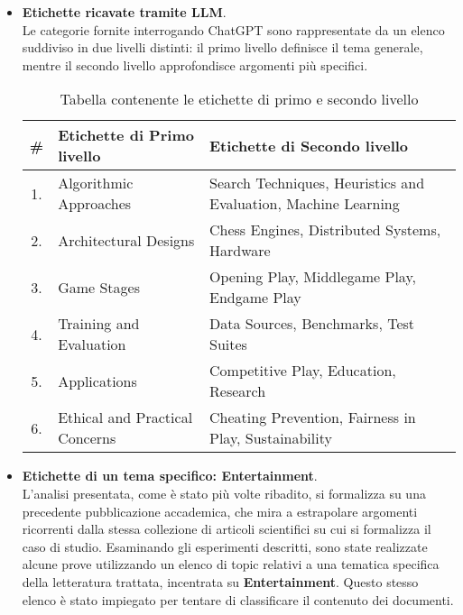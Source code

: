 \begin{itemize}
    \renewcommand{\labelitemi}{-}
    \item \textbf{Etichette ricavate tramite LLM}. \\
    Le categorie fornite interrogando ChatGPT sono rappresentate da un elenco suddiviso in due livelli distinti: il primo livello definisce il tema generale, mentre il secondo livello approfondisce argomenti più specifici.
    \begin{table}[H]
        \begin{tabularx}{\textwidth}{|c|X|X|}
            \hline
            \small \textbf{\#} & \small \textbf{Etichette di Primo livello} & \small \textbf{Etichette di Secondo livello} \\
            \hline
            \small 1. & \small Algorithmic Approaches & \small Search Techniques, Heuristics and Evaluation, Machine Learning \\
            \hline
            \small 2. & \small Architectural Designs & \small Chess Engines, Distributed Systems, Hardware \\
            \hline
            \small 3. & \small Game Stages & \small Opening Play, Middlegame Play, Endgame Play \\
            \hline
            \small 4. & \small Training and Evaluation & \small Data Sources, Benchmarks, Test Suites \\
            \hline
            \small 5. & \small Applications & \small Competitive Play, Education, Research \\
            \hline
            \small 6. & \small Ethical and Practical Concerns & \small Cheating Prevention, Fairness in Play, Sustainability \\
            \hline
        \end{tabularx}
        \caption{Tabella contenente le etichette di primo e secondo livello}
    \end{table}
    \item \textbf{Etichette di un tema specifico: Entertainment}. \\
    L'analisi presentata, come è stato più volte ribadito, si formalizza su una precedente pubblicazione accademica, che mira a estrapolare argomenti ricorrenti dalla stessa collezione di articoli scientifici su cui si formalizza il caso di studio. Esaminando gli esperimenti descritti, sono state realizzate alcune prove utilizzando un elenco di topic relativi a una tematica specifica della letteratura trattata, incentrata su \textbf{Entertainment}. Questo stesso elenco è stato impiegato per tentare di classificare il contenuto dei documenti.

\end{itemize}
